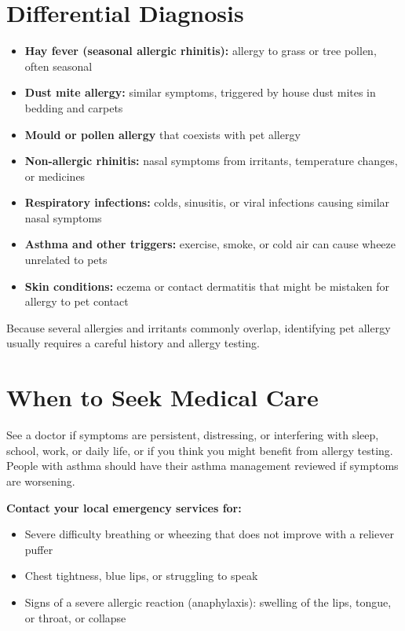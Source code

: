 \section*{Differential Diagnosis}
\begin{itemize}
    \item \textbf{Hay fever (seasonal allergic rhinitis):} allergy to grass or tree pollen, often seasonal
    \item \textbf{Dust mite allergy:} similar symptoms, triggered by house dust mites in bedding and carpets
    \item \textbf{Mould or pollen allergy} that coexists with pet allergy
    \item \textbf{Non-allergic rhinitis:} nasal symptoms from irritants, temperature changes, or medicines
    \item \textbf{Respiratory infections:} colds, sinusitis, or viral infections causing similar nasal symptoms
    \item \textbf{Asthma and other triggers:} exercise, smoke, or cold air can cause wheeze unrelated to pets
    \item \textbf{Skin conditions:} eczema or contact dermatitis that might be mistaken for allergy to pet contact
\end{itemize}

Because several allergies and irritants commonly overlap, identifying pet allergy usually requires a careful history and allergy testing.

\section*{When to Seek Medical Care}
See a doctor if symptoms are persistent, distressing, or interfering with sleep, school, work, or daily life, or if you think you might benefit from allergy testing. People with asthma should have their asthma management reviewed if symptoms are worsening.

\textbf{Contact your local emergency services for:}
\begin{itemize}
    \item Severe difficulty breathing or wheezing that does not improve with a reliever puffer
    \item Chest tightness, blue lips, or struggling to speak
    \item Signs of a severe allergic reaction (anaphylaxis): swelling of the lips, tongue, or throat, or collapse
\end{itemize}


